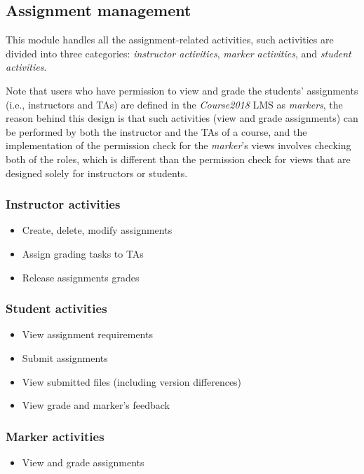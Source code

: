 \subsection{Assignment management}
\label{sec:ASNMAN}
This module handles all the assignment-related activities, such activities are
divided into three categories: \emph{instructor activities}, 
\emph{marker activities}, and \emph{student activities}.

\medskip 

Note that users who have permission to view and grade the students' assignments
(i.e., instructors and TAs)
are defined in the \emph{Course2018} LMS as \emph{markers}, the reason behind
this design is that such activities (view and grade assignments) can be
performed by both the instructor and the TAs of a course, and the implementation
of the permission check for the \emph{marker}'s views involves checking both
of the roles, which is different than the permission check for views that are
designed solely for instructors or students.

\medskip

\subsubsection{Instructor activities}
\begin{itemize}
    \item Create, delete, modify assignments
    \item Assign grading tasks to TAs
    \item Release assignments grades
\end{itemize}

\subsubsection{Student activities}
\begin{itemize}
    \item View assignment requirements
    \item Submit assignments
    \item View submitted files (including version differences)
    \item View grade and marker's feedback
\end{itemize}

\subsubsection{Marker activities}
\begin{itemize}
    \item View and grade assignments
\end{itemize}

